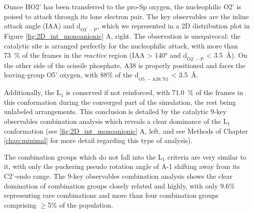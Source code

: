 \documentclass[journal=jacsat,manuscript=article]{achemso}
\begin{document}
Ounce HO2' has been transferred to the pro-Sp oxygen, the nucleophilic O2' is poised to attack through its lone electron pair.
The key observables are the inline attack angle (IAA) and d$_\mathrm{O2^{\prime}-P}$, 
which we represented in a 2D distribution plot in Figure \ref{fig:2D_int_monoanionic} A, right.
The observation is unequivocal: the catalytic site is arranged perfectly for the nucleophilic attack, 
with more than 73~\% of the frames in the \textit{reactive} region (IAA > 140° and d$_\mathrm{O2^{\prime}-P}$ < 3.5~\AA).
On the other side of the scissile phosphate, A38 is properly positioned 
and faces the leaving-group O5' oxygen, with 88$\%$ of the d$_\mathrm{O5^{\prime}-A38:N1}$ < 3.5~\AA.

Additionally, the L$_\mathrm{1}$ is conserved if not reinforced, with 71.0~\% 
of the frames in this conformation during the converged part of the simulation, the rest being unlabeled arrangements.
This conclusion is detailed by the catalytic 9-key observables combination analysis 
which reveals a clear dominance of the L$_\mathrm{1}$ conformation (see \ref{fig:2D_int_monoanionic} A, left, 
and see Methods of Chapter \ref{chap:minimal} for more detail regarding this type of analysis).

The combination groups which do not fall into the L$_\mathrm{1}$ criteria are very similar to it, 
with only the puckering pseudo rotation angle of A-1 shifting away from its C2'-endo range.
The  9-key observables combination analysis shows the clear domination of combination groups closely related 
and highly, 
with only 9.6\% representing rare combinations and more than four combination groups comprising $\geq$5\% of the population.
\end{document}
